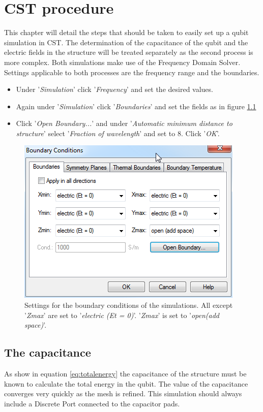 \chapter{CST procedure}
This chapter will detail the steps that should be taken to easily set up a qubit simulation in CST. The determination of the capacitance of the qubit and the electric fields in the structure will be treated separately as the second process is more complex. Both simulations make use of the Frequency Domain Solver. Settings applicable to both processes are the frequency range and the boundaries. 
\begin{itemize}
	\item Under '\textit{Simulation}' click '\textit{Frequency}' and set the desired values.
	\item Again under '\textit{Simulation}' click '\textit{Boundaries}' and set the fields as in figure \ref{fig:Boundaries}
	\item Click '\textit{Open Boundary...}' and under '\textit{Automatic minimum distance to structure}' select '\textit{Fraction of wavelength}' and set to 8. Click '\textit{OK}'.
\end{itemize}

\begin{figure}[h]
	\begin{center}
		\includegraphics[scale = .7]{Figures/Boundaries}
		\caption{Settings for the boundary conditions of the simulations. All except '\textit{Zmax}' are set to '\textit{electric (Et = 0)}'. '\textit{Zmax}' is set to '\textit{open(add space)}'.}
		\label{fig:Boundaries}
	\end{center}
\end{figure}

\section{The capacitance}
As show in equation \eqref{eq:totalenergy} the capacitance of the structure must be known to calculate the total energy in the qubit. The value of the capacitance converges very quickly as the mesh is refined. This simulation should always include a Discrete Port connected to the capacitor pads.
% 
